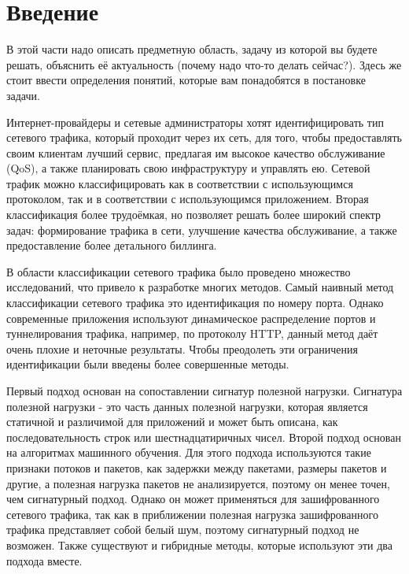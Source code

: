 \section{Введение}
\label{sec:Chapter0} 

\begin{tcolorbox}
    В этой части надо описать предметную область, задачу из которой вы будете решать, объяснить её актуальность (почему надо что-то делать сейчас?).
    Здесь же стоит ввести определения понятий, которые вам понадобятся в постановке задачи.
\end{tcolorbox}

Интернет-провайдеры и сетевые администраторы хотят идентифицировать тип сетевого трафика, который проходит через их сеть, для того,
чтобы предоставлять своим клиентам лучший сервис, предлагая им высокое качество обслуживание (QoS),
а также планировать свою инфраструктуру и управлять ею. Сетевой трафик можно классифицировать как в соответствии с использующимся протоколом,
так и в соответствии с использующимся приложением. Вторая классификация более трудоёмкая, но позволяет решать более широкий спектр задач:
формирование трафика в сети, улучшение качества обслуживание, а также предоставление более детального биллинга.

В области классификации сетевого трафика было проведено множество исследований, что привело к разработке многих методов.
Самый наивный метод классификации сетевого трафика это идентификация по номеру порта.
Однако современные приложения используют динамическое распределение портов и туннелирования трафика, например, по протоколу HTTP,
данный метод даёт очень плохие и неточные результаты. Чтобы преодолеть эти ограничения идентификации были введены более совершенные методы.

Первый подход основан на сопоставлении сигнатур полезной нагрузки. Сигнатура полезной нагрузки - это часть данных полезной нагрузки,
которая является статичной и различимой для приложений и может быть описана, как последовательность строк или шестнадцатиричных чисел.
Второй подход основан на алгоритмах машинного обучения. Для этого подхода используются такие признаки потоков и пакетов,
как задержки между пакетами, размеры пакетов и другие, а полезная нагрузка пакетов не анализируется, поэтому он менее точен, чем сигнатурный подход.
Однако он может применяться для зашифрованного сетевого трафика, так как в приближении полезная нагрузка зашифрованного трафика представляет собой белый шум,
поэтому сигнатурный подход не возможен. Также существуют и гибридные методы, которые используют эти два подхода вместе.

